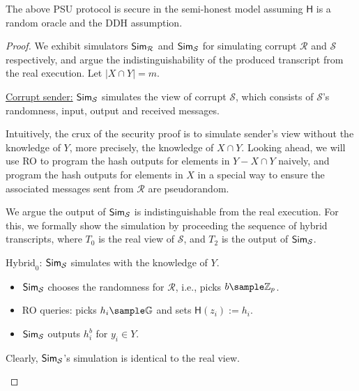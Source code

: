 \begin{theorem}
The above PSU protocol is secure in the semi-honest model assuming $\mathsf{H}$ is a random oracle and the DDH assumption.
\end{theorem}

\begin{proof}
We exhibit simulators $\mathsf{Sim}_\mathcal{R}$ and $\mathsf{Sim}_\mathcal{S}$ for simulating corrupt $\mathcal{R}$ and $\mathcal{S}$ respectively, 
and argue the indistinguishability of the produced transcript from the real execution. Let $|X \cap Y| = m$. 


\begin{trivlist}
\item \underline{Corrupt sender:} $\mathsf{Sim}_\mathcal{S}$ simulates the view of corrupt $\mathcal{S}$, 
    which consists of $\mathcal{S}$'s randomness, input, output and received messages.

    Intuitively, the crux of the security proof is to simulate sender's view without the knowledge of $Y$, 
    more precisely, the knowledge of $X \cap Y$. 
    Looking ahead, we will use RO to program the hash outputs for elements in $Y - X \cap Y$ naively, 
    and program the hash outputs for elements in $X$ in a special way to ensure the associated messages sent from $\mathcal{R}$ 
    are pseudorandom. 
 
    We argue the output of $\mathsf{Sim}_\mathcal{S}$ is indistinguishable from the real execution. 
    For this, we formally show the simulation by proceeding the sequence of hybrid transcripts, 
    where $T_0$ is the real view of $\mathcal{S}$, and $T_2$ is the output of $\mathsf{Sim}_\mathcal{S}$. 

\item $\text{Hybrid}_0$: $\mathsf{Sim}_\mathcal{S}$ simulates with the knowledge of $Y$. 
\begin{itemize}
    \item $\mathsf{Sim}_\mathcal{S}$ chooses the randomness for $\mathcal{R}$, i.e., picks $b \sample \mathbb{Z}_p$.
    
    \item RO queries: picks $h_i \sample \mathbb{G}$ and sets $\mathsf{H}(z_i):=h_i$. 

    \item $\mathsf{Sim}_\mathcal{S}$ outputs $h_i^b$ for $y_i \in Y$.     
\end{itemize}
Clearly, $\mathsf{Sim}_\mathcal{S}$'s simulation is identical to the real view. 

\begin{center}
\end{center}
\end{trivlist}
\end{proof}
